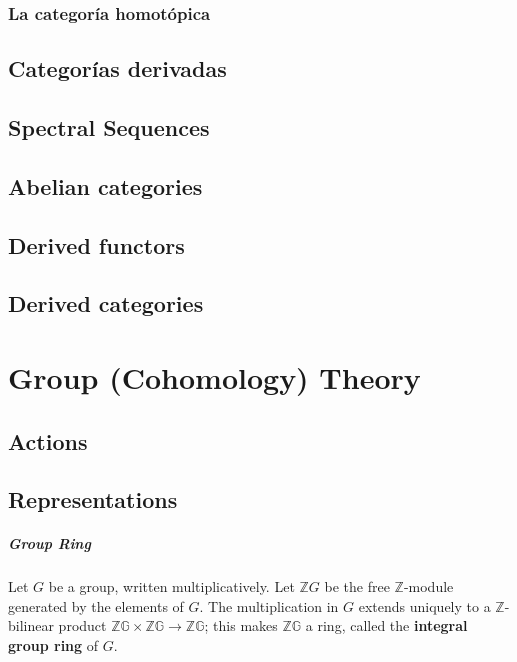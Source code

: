 \subsection{La categoría homotópica}





\section{Categorías derivadas}








\section{Spectral Sequences}


\section{Abelian categories}

\section{Derived functors}

\section{Derived categories}





\chapter{Group (Cohomology) Theory} 


\section{Actions}

\section{Representations}


\paragraph*{Group Ring}

Let $G$ be a group, written multiplicatively. Let $\mathbb{Z} G$ be the free $\mathbb{Z}$-module generated by the elements of $G$. The multiplication in $G$ extends uniquely to a $\mathbb{Z}$-bilinear product $\mathbb{Z G} \times \mathbb{Z G} \rightarrow \mathbb{Z G}$; this makes $\mathbb{Z G}$ a ring, called the \textbf{integral group ring} of $G$.

